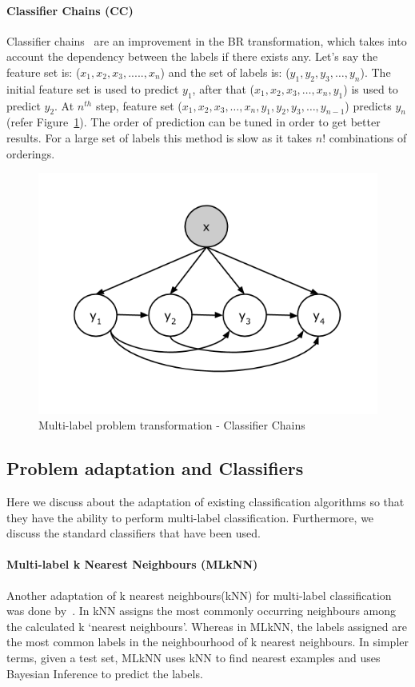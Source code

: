 \paragraph{Classifier Chains (CC)}
Classifier chains~\cite{dembczynski2010bayes, read2011classifier} are an improvement in the BR transformation, which takes into account the dependency between the labels if there exists any. Let's say the feature set is: ($x_1, x_2, x_3,....., x_n$) and the set of labels is: ($y_1, y_2, y_3,\ldots, y_n$). The initial feature set is used to predict $y_1$, after that ($x_1, x_2, x_3,\ldots, x_n, y_1$) is used to predict $y_2$. At $n^{th}$ step, feature set ($x_1, x_2, x_3,\ldots, x_n, y_1, y_2, y_3,\ldots, y_{n-1} $) predicts $y_n$ (refer Figure~\ref{fig:CC}). The order of prediction can be tuned in order to get better results. For a large set of labels this method is slow as it takes $n!$ combinations of orderings. 
\begin{figure}[!htb]
    \centering
    \includegraphics[scale=0.5]{Figures/ClassifierChains.png}
    \caption{Multi-label problem transformation - Classifier Chains}
    \label{fig:CC}
\end{figure}

\subsection{Problem adaptation and Classifiers}
Here we discuss about the adaptation of existing classification algorithms so that they have the ability to perform multi-label classification. Furthermore, we discuss the standard classifiers that have been used. 

\paragraph{Multi-label k Nearest Neighbours (MLkNN)} 
Another adaptation of k nearest neighbours(kNN) for multi-label classification was done by~\cite{zhang2007ml}. In kNN assigns the most commonly occurring neighbours among the calculated k `nearest neighbours'. Whereas in MLkNN, the labels assigned are the most common labels in the neighbourhood of k nearest neighbours. In simpler terms, given a test set, MLkNN uses kNN to find nearest examples and uses Bayesian Inference to predict the labels.

